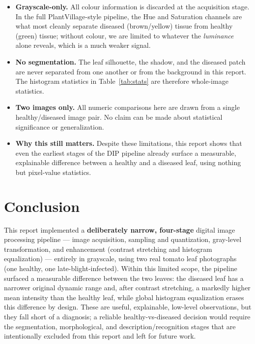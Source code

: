\documentclass[11pt,a4paper]{article}
\begin{document}
\begin{itemize}
    \item \textbf{Grayscale-only.} All colour information is discarded at the acquisition stage. In the full PlantVillage-style pipeline, the Hue and Saturation channels are what most cleanly separate diseased (brown/yellow) tissue from healthy (green) tissue; without colour, we are limited to whatever the \textit{luminance} alone reveals, which is a much weaker signal.
    \item \textbf{No segmentation.} The leaf silhouette, the shadow, and the diseased patch are never separated from one another or from the background in this report. The histogram statistics in Table~\ref{tab:stats} are therefore whole-image statistics.
    \item \textbf{Two images only.} All numeric comparisons here are drawn from a single healthy/diseased image pair. No claim can be made about statistical significance or generalization.
    \item \textbf{Why this still matters.} Despite these limitations, this report shows that even the earliest stages of the DIP pipeline already surface a measurable, explainable difference between a healthy and a diseased leaf, using nothing but pixel-value statistics.
\end{itemize}

\section{Conclusion}

This report implemented a \textbf{deliberately narrow, four-stage} digital image processing pipeline --- image acquisition, sampling and quantization, gray-level transformation, and enhancement (contrast stretching and histogram equalization) --- entirely in grayscale, using two real tomato leaf photographs (one healthy, one late-blight-infected). Within this limited scope, the pipeline surfaced a measurable difference between the two leaves: the diseased leaf has a narrower original dynamic range and, after contrast stretching, a markedly higher mean intensity than the healthy leaf, while global histogram equalization erases this difference by design. These are useful, explainable, low-level observations, but they fall short of a diagnosis; a reliable healthy-vs-diseased decision would require the segmentation, morphological, and description/recognition stages that are intentionally excluded from this report and left for future work.
\end{document}
